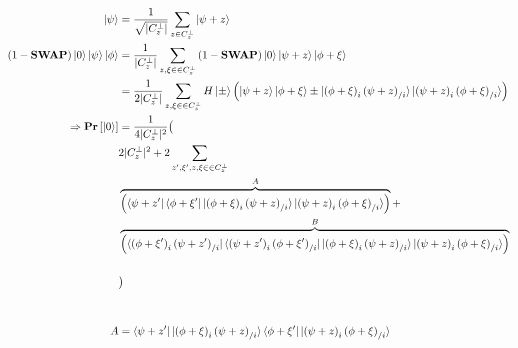 \documentclass[manuscript,screen,review]{acmart}
\begin{document}
\begin{equation*}
  \begin{split}
    \ket{\psi} & = \frac{1}{\sqrt{|C_{z}^{\perp}|}}\sum_{z \in C_{z}^{\perp}}{ \ket{\psi + z   }} \\ 
    (1-\mathbf{SWAP})\ket{0}\ket{\psi}\ket{\phi} &= \frac{1}{|C_{z}^{\perp}|}\sum_{z,\xi \in  \in C_{z}^{\perp} }{(1-\mathbf{SWAP})\ket{0} \ket{\psi + z   }\ket{\phi + \xi   }}\\
    & = \frac{1}{2|C_{z}^{\perp}|}\sum_{z,\xi \in  \in C_{z}^{\perp} }{  H\ket{\pm} \left( \ket{\psi + z   }\ket{\phi + \xi   }  \pm  \ket{  \left( \phi + \xi \right)_{ i }\left( \psi + z \right)_{ / i }   }\ket{\left( \psi + z \right)_{ i }\left( \phi + \xi \right)_{ / i }  }  \right) }\\
    \Rightarrow \mathbf{Pr} \left[ { \ket{0} } \right] &=  \frac{1}{4|C_{z}^{\perp}|^{2}} \big( \\ 
      & 2 |C_{z}^{\perp}|^{2} + 2 \sum_{z^{\prime},\xi^{\prime},  z,\xi \in  \in C_{z}^{\perp} }   \\
    & \overbrace{ \left(    \bra{\psi + z^{\prime}   }\bra{\phi + \xi^{\prime}   } \ket{  \left( \phi + \xi \right)_{ i }\left( \psi + z \right)_{ / i }   }\ket{\left( \psi + z \right)_{ i }\left( \phi + \xi \right)_{ / i }  }  \right)}^{A} +\\
  &  \overbrace{\left(   \bra{  \left( \phi + \xi^{\prime} \right)_{ i }\left( \psi + z^{\prime} \right)_{ / i }   }\bra{\left( \psi + z^{\prime} \right)_{ i }\left( \phi + \xi^{\prime} \right)_{ / i }  }  \ket{  \left( \phi + \xi \right)_{ i }\left( \psi + z \right)_{ / i }   }\ket{\left( \psi + z \right)_{ i }\left( \phi + \xi \right)_{ / i }  }  \right) }^{B}\\ 
& \\ & \big) \\ & \\ & \\  
    A &=     \bra{\psi + z^{\prime}   }\ket{  \left( \phi + \xi \right)_{ i }\left( \psi + z \right)_{ / i }   } \bra{\phi + \xi^{\prime}   } \ket{\left( \psi + z \right)_{ i }\left( \phi + \xi \right)_{ / i }  }  
  \end{split}
\end{equation*}


\printbibliography
\end{document}
